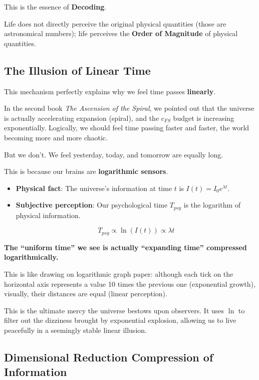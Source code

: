 \documentclass[11pt,a4paper,twoside]{book}
\begin{document}
This is the essence of \textbf{Decoding}.

Life does not directly perceive the original physical quantities (those are astronomical numbers); life perceives the \textbf{Order of Magnitude} of physical quantities.

\subsection{The Illusion of Linear Time}

This mechanism perfectly explains why we feel time passes \textbf{linearly}.

In the second book \textit{The Ascension of the Spiral}, we pointed out that the universe is actually accelerating expansion (spiral), and the $c_{FS}$ budget is increasing exponentially. Logically, we should feel time passing faster and faster, the world becoming more and more chaotic.

But we don't. We feel yesterday, today, and tomorrow are equally long.

This is because our brains are \textbf{logarithmic sensors}.

\begin{itemize}
\item \textbf{Physical fact}: The universe's information at time $t$ is $I(t) = I_0 e^{\lambda t}$.

\item \textbf{Subjective perception}: Our psychological time $T_{psy}$ is the logarithm of physical information.

    $$T_{psy} \propto \ln(I(t)) \propto \lambda t$$
\end{itemize}

\textbf{The ``uniform time'' we see is actually ``expanding time'' compressed logarithmically.}

This is like drawing on logarithmic graph paper: although each tick on the horizontal axis represents a value 10 times the previous one (exponential growth), visually, their distances are equal (linear perception).

This is the ultimate mercy the universe bestows upon observers. It uses $\ln$ to filter out the dizziness brought by exponential explosion, allowing us to live peacefully in a seemingly stable linear illusion.

\subsection{Dimensional Reduction Compression of Information}
\end{document}
